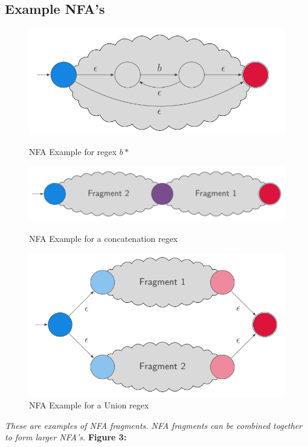 \documentclass[12pt]{article}
\begin{document}
\subsection{Example NFA's}
\begin{description}
\begin{figure}[h!]
\centering
\includegraphics[scale=0.6]{Photos/KleeneStarFrag.png}
\caption{NFA Example for regex $b*$}
\label{fig:nfa}
\includegraphics[scale=0.6]{Photos/Concatenation.png}
\caption{NFA Example for a concatenation regex}
\label{fig:nfa}
\includegraphics[scale=0.6]{Photos/Union.png}
\caption{NFA Example for a Union regex}
\label{fig:nfa}
\end{figure}
\cite{moodle}
\emph{These are examples of NFA fragments. NFA fragments can be combined together to form larger NFA's.}
\newline\newline
\textbf{Figure 3:}
\newline\newline

\end{description}
\end{document}
